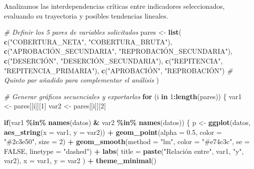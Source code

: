 \documentclass[
]{article}
\newenvironment{Shaded}{\begin{snugshade}}{\end{snugshade}}
\newcommand{\AttributeTok}[1]{\textcolor[rgb]{0.13,0.29,0.53}{#1}}
\newcommand{\CommentTok}[1]{\textcolor[rgb]{0.56,0.35,0.01}{\textit{#1}}}
\newcommand{\ConstantTok}[1]{\textcolor[rgb]{0.56,0.35,0.01}{#1}}
\newcommand{\ControlFlowTok}[1]{\textcolor[rgb]{0.13,0.29,0.53}{\textbf{#1}}}
\newcommand{\DecValTok}[1]{\textcolor[rgb]{0.00,0.00,0.81}{#1}}
\newcommand{\FloatTok}[1]{\textcolor[rgb]{0.00,0.00,0.81}{#1}}
\newcommand{\FunctionTok}[1]{\textcolor[rgb]{0.13,0.29,0.53}{\textbf{#1}}}
\newcommand{\NormalTok}[1]{#1}
\newcommand{\OtherTok}[1]{\textcolor[rgb]{0.56,0.35,0.01}{#1}}
\newcommand{\SpecialCharTok}[1]{\textcolor[rgb]{0.81,0.36,0.00}{\textbf{#1}}}
\newcommand{\StringTok}[1]{\textcolor[rgb]{0.31,0.60,0.02}{#1}}
\begin{document}
Analizamos las interdependencias críticas entre indicadores
seleccionados, evaluando su trayectoria y posibles tendencias lineales.

\begin{Shaded}
\begin{Highlighting}[]
\CommentTok{\# Definir los 5 pares de variables solicitados}
\NormalTok{pares }\OtherTok{\textless{}{-}} \FunctionTok{list}\NormalTok{(}
  \FunctionTok{c}\NormalTok{(}\StringTok{"COBERTURA\_NETA"}\NormalTok{, }\StringTok{"COBERTURA\_BRUTA"}\NormalTok{),}
  \FunctionTok{c}\NormalTok{(}\StringTok{"APROBACIÓN\_SECUNDARIA"}\NormalTok{, }\StringTok{"REPROBACIÓN\_SECUNDARIA"}\NormalTok{),}
  \FunctionTok{c}\NormalTok{(}\StringTok{"DESERCIÓN"}\NormalTok{, }\StringTok{"DESERCIÓN\_SECUNDARIA"}\NormalTok{),}
  \FunctionTok{c}\NormalTok{(}\StringTok{"REPITENCIA"}\NormalTok{, }\StringTok{"REPITENCIA\_PRIMARIA"}\NormalTok{),}
  \FunctionTok{c}\NormalTok{(}\StringTok{"APROBACIÓN"}\NormalTok{, }\StringTok{"REPROBACIÓN"}\NormalTok{) }\CommentTok{\# Quinto par añadido para complementar el análisis}
\NormalTok{)}

\CommentTok{\# Generar gráficos secuenciales y exportarlos}
\ControlFlowTok{for}\NormalTok{ (i }\ControlFlowTok{in} \DecValTok{1}\SpecialCharTok{:}\FunctionTok{length}\NormalTok{(pares)) \{}
\NormalTok{  var1 }\OtherTok{\textless{}{-}}\NormalTok{ pares[[i]][}\DecValTok{1}\NormalTok{]}
\NormalTok{  var2 }\OtherTok{\textless{}{-}}\NormalTok{ pares[[i]][}\DecValTok{2}\NormalTok{]}
  
  \ControlFlowTok{if}\NormalTok{(var1 }\SpecialCharTok{\%in\%} \FunctionTok{names}\NormalTok{(datos) }\SpecialCharTok{\&}\NormalTok{ var2 }\SpecialCharTok{\%in\%} \FunctionTok{names}\NormalTok{(datos)) \{}
\NormalTok{    p }\OtherTok{\textless{}{-}} \FunctionTok{ggplot}\NormalTok{(datos, }\FunctionTok{aes\_string}\NormalTok{(}\AttributeTok{x =}\NormalTok{ var1, }\AttributeTok{y =}\NormalTok{ var2)) }\SpecialCharTok{+}
      \FunctionTok{geom\_point}\NormalTok{(}\AttributeTok{alpha =} \FloatTok{0.5}\NormalTok{, }\AttributeTok{color =} \StringTok{"\#2c3e50"}\NormalTok{, }\AttributeTok{size =} \DecValTok{2}\NormalTok{) }\SpecialCharTok{+}
      \FunctionTok{geom\_smooth}\NormalTok{(}\AttributeTok{method =} \StringTok{"lm"}\NormalTok{, }\AttributeTok{color =} \StringTok{"\#e74c3c"}\NormalTok{, }\AttributeTok{se =} \ConstantTok{FALSE}\NormalTok{, }\AttributeTok{linetype =} \StringTok{"dashed"}\NormalTok{) }\SpecialCharTok{+}
      \FunctionTok{labs}\NormalTok{(}
        \AttributeTok{title =} \FunctionTok{paste}\NormalTok{(}\StringTok{"Relación entre"}\NormalTok{, var1, }\StringTok{"y"}\NormalTok{, var2), }
        \AttributeTok{x =}\NormalTok{ var1, }
        \AttributeTok{y =}\NormalTok{ var2}
\NormalTok{      ) }\SpecialCharTok{+}
      \FunctionTok{theme\_minimal}\NormalTok{()}
    

\end{Highlighting}
\end{Shaded}
\end{document}
